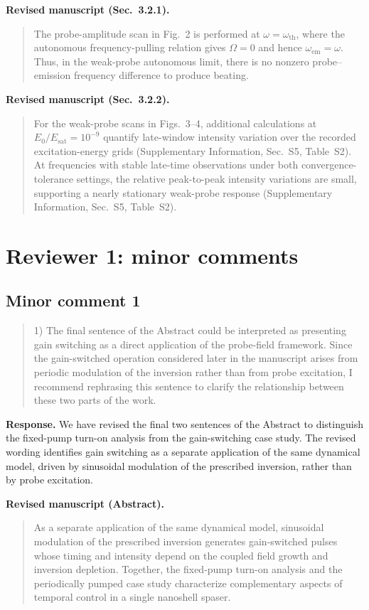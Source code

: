 \documentclass[11pt,a4paper]{article}
\newif\ifshowrevisions
\newcommand{\revised}[1]{{\ifshowrevisions\color{revisionblue}\fi #1}}
\newcommand{\minorrevised}[1]{{\ifshowrevisions\color{revisiongreen}\fi #1}}
\newcommand{\reviewercomment}[1]{\begin{quote}\small #1\end{quote}}
\newcommand{\response}[1]{\par\textbf{Response.} #1\par}
\newcommand{\manuscripttext}[2]{\par\textbf{Revised manuscript (#1).}\begin{quote}\revised{#2}\end{quote}}
\newcommand{\minormanuscripttext}[2]{\par\textbf{Revised manuscript (#1).}\begin{quote}\minorrevised{#2}\end{quote}}
\begin{document}
\manuscripttext{Sec.~3.2.1}{The probe-amplitude scan in Fig.~2 is performed at $\omega=\omega_{\mathrm{th}}$, where the autonomous frequency-pulling relation gives $\Omega=0$ and hence $\omega_{\mathrm{em}}=\omega$. Thus, in the weak-probe autonomous limit, there is no nonzero probe--emission frequency difference to produce beating.}
\manuscripttext{Sec.~3.2.2}{For the weak-probe scans in Figs.~3--4, additional calculations at $E_0/E_{\mathrm{sat}}=10^{-9}$ quantify late-window intensity variation over the recorded excitation-energy grids (Supplementary Information, Sec.~S5, Table~S2). At frequencies with stable late-time observations under both convergence-tolerance settings, the relative peak-to-peak intensity variations are small, supporting a nearly stationary weak-probe response (Supplementary Information, Sec.~S5, Table~S2).}


\section*{Reviewer 1: minor comments}

\subsection*{Minor comment 1}
\label{r1-minor-1}
\reviewercomment{
1) The final sentence of the Abstract could be interpreted as presenting gain switching as a direct application of the probe-field framework. Since the gain-switched operation considered later in the manuscript arises from periodic modulation of the inversion rather than from probe excitation, I recommend rephrasing this sentence to clarify the relationship between these two parts of the work.
}
\response{We have revised the final two sentences of the Abstract to distinguish the fixed-pump turn-on analysis from the gain-switching case study. The revised wording identifies gain switching as a separate application of the same dynamical model, driven by sinusoidal modulation of the prescribed inversion, rather than by probe excitation.}
\minormanuscripttext{Abstract}{As a separate application of the same dynamical model, sinusoidal modulation of the prescribed inversion generates gain-switched pulses whose timing and intensity depend on the coupled field growth and inversion depletion. Together, the fixed-pump turn-on analysis and the periodically pumped case study characterize complementary aspects of temporal control in a single nanoshell spaser.}
\end{document}
